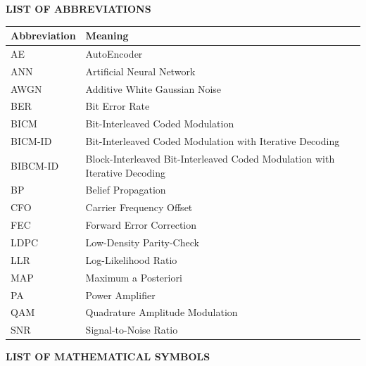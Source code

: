 \documentclass[a4paper,14pt]{extreport}
\begin{document}
\newpage
{}
\begin{center}
  {\bfseries LIST OF ABBREVIATIONS}
\end{center}

\begin{longtable}{>{\raggedright\arraybackslash}p{3cm}>{\raggedright\arraybackslash}p{11cm}}
\toprule
\textbf{Abbreviation} & \textbf{Meaning}\\
\midrule
AE & AutoEncoder\\
ANN & Artificial Neural Network\\
AWGN & Additive White Gaussian Noise\\
BER & Bit Error Rate\\
BICM & Bit-Interleaved Coded Modulation\\
BICM-ID & Bit-Interleaved Coded Modulation with Iterative Decoding\\
BIBCM-ID & Block-Interleaved Bit-Interleaved Coded Modulation with Iterative Decoding\\
BP & Belief Propagation\\
CFO & Carrier Frequency Offset\\
FEC & Forward Error Correction\\
LDPC & Low-Density Parity-Check\\
LLR & Log-Likelihood Ratio\\
MAP & Maximum a Posteriori\\
PA & Power Amplifier\\
QAM & Quadrature Amplitude Modulation\\
SNR & Signal-to-Noise Ratio\\
\bottomrule
\end{longtable}

\newpage
{}
\begin{center}
  {\bfseries LIST OF MATHEMATICAL SYMBOLS}
\end{center}
\end{document}
